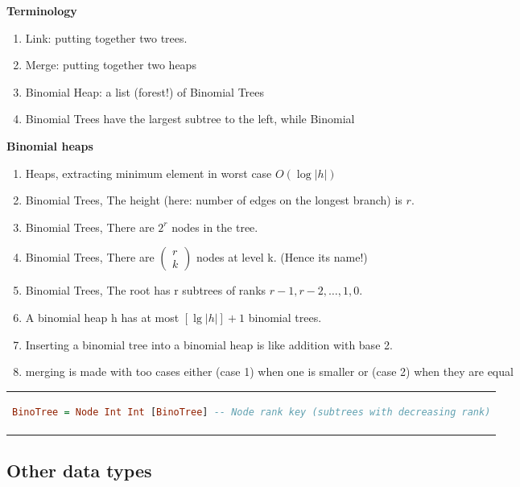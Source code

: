 \begin{multicols}{2}
\textbf{Terminology}
\begin{enumerate}
\item  Link: putting together two trees.
\item  Merge: putting together two heaps
\item  Binomial Heap: a list (forest!) of Binomial Trees
\item  Binomial Trees have the largest subtree to the left, while Binomial
\end{enumerate}

\textbf{Binomial heaps}
\begin{enumerate}
\item  Heaps, extracting minimum element in worst case $O(\log{|h|})$
\item  Binomial Trees, The height (here: number of edges on the longest branch) is $r$.
\item  Binomial Trees, There are $2^r$ nodes in the tree.
\item  Binomial Trees, There are $\left(\begin{array}{l}{r}\\{k}\end{array}\right)$ nodes at level k.
  (Hence its name!)
\item  Binomial Trees, The root has r subtrees of ranks $r-1,r-2,\ldots,1,0$.
\item  A binomial heap h has at most $[\lg|h|]+1$ binomial trees.
\item  Inserting a binomial tree into a binomial heap is like addition with base 2.
\item  merging is made with too cases either (case 1) when one is smaller or (case 2) when they are equal
\end{enumerate}

\begin{center}
\begin{tabular}{c}
\begin{lstlisting}[language=Haskell]
  BinoTree = Node Int Int [BinoTree] -- Node rank key (subtrees with decreasing rank)
\end{lstlisting}
\end{tabular}
\end{center}
\end{multicols}
\raggedcolumns


\subsection{Other data types}
